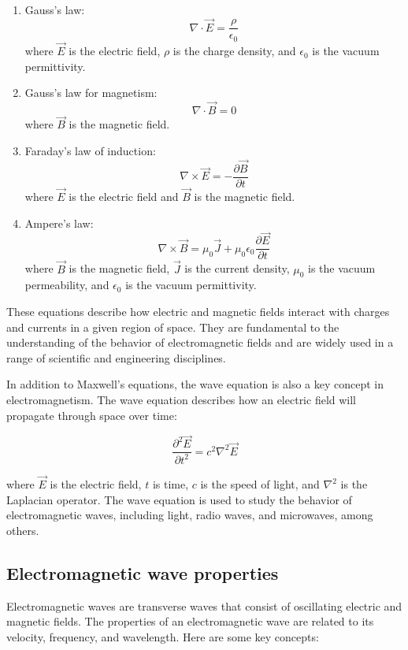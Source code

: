 \documentclass{article}
\begin{document}
\begin{enumerate}
\item Gauss's law:
\[\nabla \cdot \vec{E} = \frac{\rho}{\epsilon_0}\]
where $\vec{E}$ is the electric field, $\rho$ is the charge density, and $\epsilon_0$ is the vacuum permittivity.

\item Gauss's law for magnetism:
\[\nabla \cdot \vec{B} = 0\]
where $\vec{B}$ is the magnetic field.

\item Faraday's law of induction:
\[\nabla \times \vec{E} = -\frac{\partial \vec{B}}{\partial t}\]
where $\vec{E}$ is the electric field and $\vec{B}$ is the magnetic field.

\item Ampere's law:
\[\nabla \times \vec{B} = \mu_0 \vec{J} + \mu_0 \epsilon_0 \frac{\partial \vec{E}}{\partial t}\]
where $\vec{B}$ is the magnetic field, $\vec{J}$ is the current density,
$\mu_0$ is the vacuum permeability, and $\epsilon_0$ is the vacuum
permittivity.
\end{enumerate}

These equations describe how electric and magnetic fields interact with charges
and currents in a given region of space. They are fundamental to the
understanding of the behavior of electromagnetic fields and are widely used in
a range of scientific and engineering disciplines.

In addition to Maxwell's equations, the wave equation is also a key concept in
electromagnetism. The wave equation describes how an electric field will
propagate through space over time:

\[\frac{\partial^2 \vec{E}}{\partial t^2} = c^2 \nabla^2 \vec{E}\]

where $\vec{E}$ is the electric field, $t$ is time, $c$ is the speed of light,
and $\nabla^2$ is the Laplacian operator. The wave equation is used to study
the behavior of electromagnetic waves, including light, radio waves, and
microwaves, among others.
\subsection{Electromagnetic wave properties} %
\label{ssub:Electromagnetic wave properties}
Electromagnetic waves are transverse waves that consist of oscillating electric
and magnetic fields. The properties of an electromagnetic wave are related to
its velocity, frequency, and wavelength. Here are some key concepts:
\end{document}
